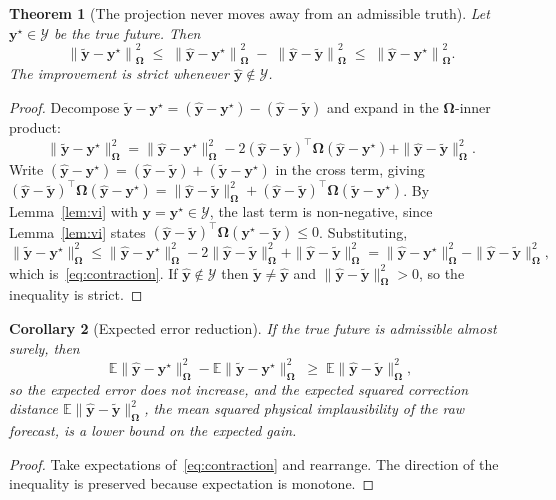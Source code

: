 \documentclass[utf8]{FrontiersinHarvard}
\newif\ifrevisionmarkup
\newcommand{\new}[1]{\ifrevisionmarkup\textcolor{revision}{#1}\else#1\fi}
\theoremstyle{plain}
\newtheorem{theorem}{Theorem}
\newtheorem{corollary}[theorem]{Corollary}
\theoremstyle{definition}
\theoremstyle{remark}
\newcommand{\by}{\bm{y}}
\newcommand{\bOm}{\bm{\Omega}}
\newcommand{\yhat}{\hat{\by}}
\newcommand{\ytil}{\tilde{\by}}
\newcommand{\cY}{\mathcal{Y}}
\begin{document}
\begin{theorem}[The projection never moves away from an admissible truth]
\label{thm:contraction}
Let $\by^{\star} \in \cY$ be the true future. Then
\begin{equation}
\left\| \ytil - \by^{\star} \right\|_{\bOm}^{2}
\;\le\;
\left\| \yhat - \by^{\star} \right\|_{\bOm}^{2}
\;-\;
\left\| \yhat - \ytil \right\|_{\bOm}^{2}
\;\le\;
\left\| \yhat - \by^{\star} \right\|_{\bOm}^{2}.
\label{eq:contraction}
\end{equation}
The improvement is strict whenever $\yhat \notin \cY$.
\end{theorem}
\begin{proof}
Decompose $\ytil - \by^{\star} = (\yhat - \by^{\star}) - (\yhat - \ytil)$ and expand in the $\bOm$-inner product:
\[
\|\ytil-\by^{\star}\|_{\bOm}^{2}
= \|\yhat-\by^{\star}\|_{\bOm}^{2} - 2(\yhat-\ytil)^{\top}\bOm(\yhat-\by^{\star}) + \|\yhat-\ytil\|_{\bOm}^{2}.
\]
Write $(\yhat-\by^{\star}) = (\yhat-\ytil) + (\ytil-\by^{\star})$ in the cross term, giving
$(\yhat-\ytil)^{\top}\bOm(\yhat-\by^{\star}) = \|\yhat-\ytil\|_{\bOm}^{2} + (\yhat-\ytil)^{\top}\bOm(\ytil-\by^{\star})$.
By Lemma~\ref{lem:vi} with $\by = \by^{\star} \in \cY$, the last term is non-negative, since Lemma~\ref{lem:vi} states $(\yhat-\ytil)^{\top}\bOm(\by^{\star}-\ytil) \le 0$. Substituting,
\[
\|\ytil-\by^{\star}\|_{\bOm}^{2}
\le \|\yhat-\by^{\star}\|_{\bOm}^{2} - 2\|\yhat-\ytil\|_{\bOm}^{2} + \|\yhat-\ytil\|_{\bOm}^{2}
= \|\yhat-\by^{\star}\|_{\bOm}^{2} - \|\yhat-\ytil\|_{\bOm}^{2},
\]
which is~\eqref{eq:contraction}. If $\yhat \notin \cY$ then $\ytil \ne \yhat$ and $\|\yhat-\ytil\|_{\bOm}^{2}>0$, so the inequality is strict.
\end{proof}

\begin{corollary}[Expected error reduction]
\label{cor:expected}
If the true future is admissible almost surely, then
\begin{equation}
\mathbb{E}\|\yhat-\by^{\star}\|_{\bOm}^{2} - \mathbb{E}\|\ytil-\by^{\star}\|_{\bOm}^{2}
\;\new{\ge}\;
\mathbb{E}\|\yhat-\ytil\|_{\bOm}^{2},
\label{eq:expectedgain}
\end{equation}
so the expected error does not increase, and the expected squared correction distance $\mathbb{E}\|\yhat-\ytil\|_{\bOm}^{2}$, the mean squared physical implausibility of the raw forecast, is a \new{lower bound on} the expected gain.
\end{corollary}
\begin{proof}
\new{Take expectations of~\eqref{eq:contraction} and rearrange. The direction of the inequality is preserved because expectation is monotone.}
\end{proof}
\end{document}
